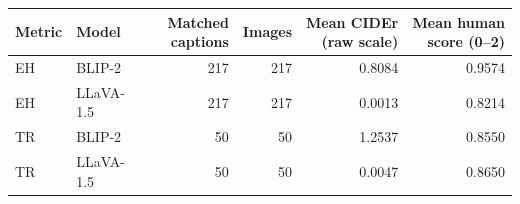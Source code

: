 \begin{tabular}{llrrrr}
\toprule
Metric & Model & Matched captions & Images & Mean CIDEr (raw scale) & Mean human score (0–2) \\
\midrule
EH & BLIP-2 & 217 & 217 & 0.8084 & 0.9574 \\
EH & LLaVA-1.5 & 217 & 217 & 0.0013 & 0.8214 \\
TR & BLIP-2 & 50 & 50 & 1.2537 & 0.8550 \\
TR & LLaVA-1.5 & 50 & 50 & 0.0047 & 0.8650 \\
\bottomrule
\end{tabular}
